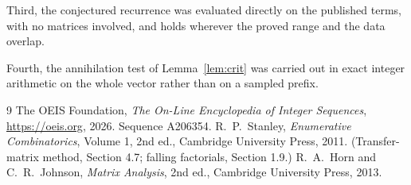 \documentclass[11pt,a4paper]{article}
\theoremstyle{plain}
\theoremstyle{definition}
\begin{document}
Third, the conjectured recurrence was evaluated directly on the published terms, with no
matrices involved, and holds wherever the proved range and the data overlap.

Fourth, the annihilation test of Lemma~\ref{lem:crit} was carried out in exact integer
arithmetic on the whole vector rather than on a sampled prefix.

\begin{thebibliography}{9}
 The OEIS Foundation, \emph{The On-Line Encyclopedia of Integer
Sequences}, \url{https://oeis.org}, 2026. Sequence A206354.
 R.~P.~Stanley, \emph{Enumerative Combinatorics}, Volume 1, 2nd ed.,
Cambridge University Press, 2011. (Transfer-matrix method, Section 4.7; falling factorials,
Section 1.9.)
 R.~A.~Horn and C.~R.~Johnson, \emph{Matrix Analysis}, 2nd ed., Cambridge
University Press, 2013.
\end{thebibliography}
\end{document}
